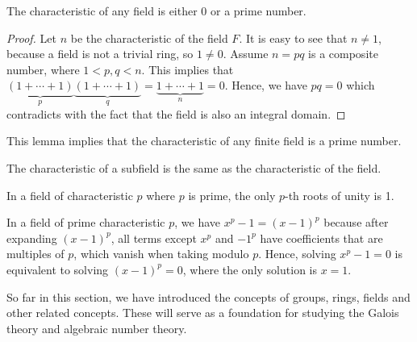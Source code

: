 \documentclass[../main.tex]{subfiles}
\begin{document}
\begin{lemma}
The characteristic of any field is either 0 or a prime number. 
\end{lemma}
\begin{proof}
Let $n$ be the characteristic of the field $F$. It is easy to see that $n \neq 1$, because a field is not a trivial ring, so $1 \neq 0$. Assume $n=pq$ is a composite number, where $1 <p,q<n$. This implies that $\underbrace{(1+\cdots + 1)}_p \underbrace{(1+\cdots + 1)}_q=\underbrace{1+\cdots + 1}_n=0$. Hence, we have $pq=0$ which contradicts with the fact that the field is also an integral domain.
\end{proof}

\begin{corollary}
This lemma implies that the characteristic of any finite field is a prime number. 
\end{corollary}

\begin{corollary}
The characteristic of a subfield is the same as the characteristic of the field. 
\end{corollary}

\begin{theorem}
In a field of characteristic $p$ where $p$ is prime, the only $p$-th roots of unity is 1.
\end{theorem}
In a field of prime characteristic $p$, we have $x^p-1 = (x-1)^p$ because after expanding $(x-1)^p$, all terms except $x^p$ and $-1^p$ have coefficients that are multiples of $p$, which vanish when taking modulo $p$. Hence, solving $x^p-1 = 0$ is equivalent to solving $(x-1)^p = 0$, where the only solution is $x=1$.


So far in this section, we have introduced the concepts of groups, rings, fields and other related concepts. These will serve as a foundation for studying the Galois theory and algebraic number theory. 



%
%
\end{document}
